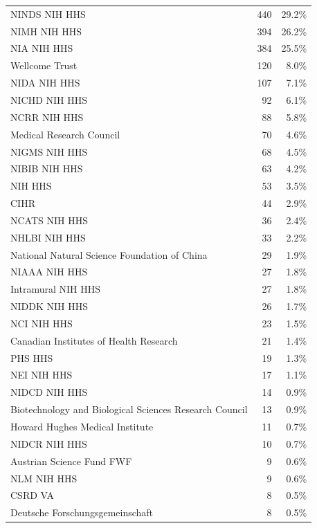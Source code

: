 \documentclass{../latex/analysis_report}
\begin{document}
\begin{longtable}{lrr}
NINDS NIH HHS & 440 & 29.2\% \\
NIMH NIH HHS & 394 & 26.2\% \\
NIA NIH HHS & 384 & 25.5\% \\
Wellcome Trust & 120 & 8.0\% \\
NIDA NIH HHS & 107 & 7.1\% \\
NICHD NIH HHS & 92 & 6.1\% \\
NCRR NIH HHS & 88 & 5.8\% \\
Medical Research Council & 70 & 4.6\% \\
NIGMS NIH HHS & 68 & 4.5\% \\
NIBIB NIH HHS & 63 & 4.2\% \\
NIH HHS & 53 & 3.5\% \\
CIHR & 44 & 2.9\% \\
NCATS NIH HHS & 36 & 2.4\% \\
NHLBI NIH HHS & 33 & 2.2\% \\
National Natural Science Foundation of China & 29 & 1.9\% \\
NIAAA NIH HHS & 27 & 1.8\% \\
Intramural NIH HHS & 27 & 1.8\% \\
NIDDK NIH HHS & 26 & 1.7\% \\
NCI NIH HHS & 23 & 1.5\% \\
Canadian Institutes of Health Research & 21 & 1.4\% \\
PHS HHS & 19 & 1.3\% \\
NEI NIH HHS & 17 & 1.1\% \\
NIDCD NIH HHS & 14 & 0.9\% \\
Biotechnology and Biological Sciences Research Council & 13 & 0.9\% \\
Howard Hughes Medical Institute & 11 & 0.7\% \\
NIDCR NIH HHS & 10 & 0.7\% \\
Austrian Science Fund FWF & 9 & 0.6\% \\
NLM NIH HHS & 9 & 0.6\% \\
CSRD VA & 8 & 0.5\% \\
Deutsche Forschungsgemeinschaft & 8 & 0.5\% \\
\end{longtable}
\end{document}

